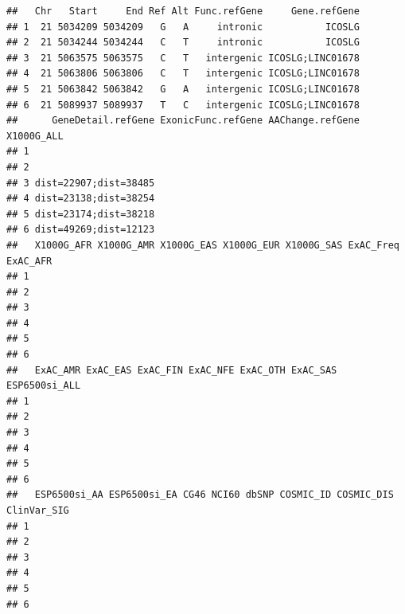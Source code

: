 \documentclass[
]{article}
\begin{document}
\begin{verbatim}
##   Chr   Start     End Ref Alt Func.refGene     Gene.refGene
## 1  21 5034209 5034209   G   A     intronic           ICOSLG
## 2  21 5034244 5034244   C   T     intronic           ICOSLG
## 3  21 5063575 5063575   C   T   intergenic ICOSLG;LINC01678
## 4  21 5063806 5063806   C   T   intergenic ICOSLG;LINC01678
## 5  21 5063842 5063842   G   A   intergenic ICOSLG;LINC01678
## 6  21 5089937 5089937   T   C   intergenic ICOSLG;LINC01678
##      GeneDetail.refGene ExonicFunc.refGene AAChange.refGene X1000G_ALL
## 1                                                                     
## 2                                                                     
## 3 dist=22907;dist=38485                                               
## 4 dist=23138;dist=38254                                               
## 5 dist=23174;dist=38218                                               
## 6 dist=49269;dist=12123                                               
##   X1000G_AFR X1000G_AMR X1000G_EAS X1000G_EUR X1000G_SAS ExAC_Freq ExAC_AFR
## 1                                                                          
## 2                                                                          
## 3                                                                          
## 4                                                                          
## 5                                                                          
## 6                                                                          
##   ExAC_AMR ExAC_EAS ExAC_FIN ExAC_NFE ExAC_OTH ExAC_SAS ESP6500si_ALL
## 1                                                                    
## 2                                                                    
## 3                                                                    
## 4                                                                    
## 5                                                                    
## 6                                                                    
##   ESP6500si_AA ESP6500si_EA CG46 NCI60 dbSNP COSMIC_ID COSMIC_DIS ClinVar_SIG
## 1                                                                            
## 2                                                                            
## 3                                                                            
## 4                                                                            
## 5                                                                            
## 6                                                                            

\end{verbatim}
\end{document}
